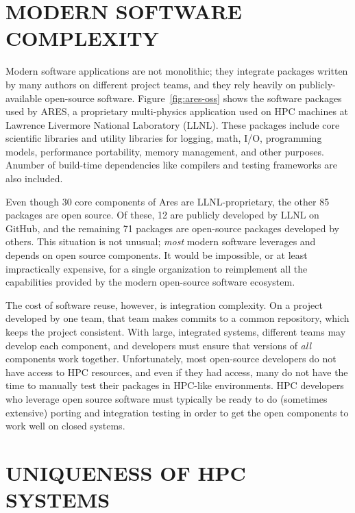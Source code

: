\documentclass{IEEEcsmag}
\begin{document}
\section{MODERN SOFTWARE COMPLEXITY}

Modern software applications are not monolithic; they integrate packages written by many
authors on different project teams, and they rely heavily on publicly-available open-source software. Figure~\ref{fig:ares-oss} shows the software packages used by ARES, a
proprietary multi-physics application used on HPC machines at Lawrence Livermore
National Laboratory (LLNL). These packages include core scientific libraries and
utility libraries for logging, math, I/O, programming models, performance portability,
memory management, and other purposes. Anumber of build-time
dependencies like compilers and testing frameworks are also included.

Even though 30 core components of Ares are LLNL-proprietary, the other 85 packages are
open source. Of these, 12 are publicly developed by LLNL on GitHub, and the remaining 71
packages are open-source packages developed by others. This situation is not unusual;
{\it most} modern software leverages and depends on open source components. It would be impossible, or at
least impractically expensive, for a single organization to reimplement all the capabilities
provided by the modern open-source software ecosystem.

The cost of software reuse, however, is integration complexity. On a project developed
by one team, that team makes commits to a common repository, which keeps the project consistent.
With large, integrated systems, different teams may develop each component, and
developers must ensure that versions of {\it all} components work together.
Unfortunately, most open-source developers do not have access to HPC resources, and even
if they had access, many do not have the time to manually test their packages
in HPC-like environments. HPC developers who leverage open source software must typically be ready to do
(sometimes extensive) porting and integration testing in order to get the open
components to work well on closed systems.

\section{UNIQUENESS OF HPC SYSTEMS}
\end{document}
